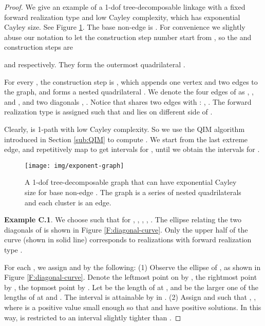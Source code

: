 \documentclass[secthm,amsthm,english]{article}
\theoremstyle{definition}
\theoremstyle{remark}
\begin{document}
\begin{proof}
We give an example of a 1-dof tree-decomposable linkage 
with a fixed forward realization type  and low Cayley complexity, 
which has exponential Cayley size. 
See Figure \ref{F:exponent-graph}. 
The base non-edge is .
For convenience we slightly abuse our notation to let 
the construction step number start from , 
so the  and  construction steps are 

and  respectively. 
They form the outermost quadrilateral .

For every , 
the  construction step  is ,
which appends one vertex and two edges to the graph, and forms a nested
quadrilateral . 
We denote the four
edges of  as , ,
 and , 
and two diagonals , .
Notice that  shares two edges with : , .
The forward realization type  is assigned such that  and  lies on
different side of . 

Clearly,  is 1-path with low Cayley complexity. 
So we use the QIM algorithm introduced in Section
\ref{sub:QIM} to compute . 
We start from the last extreme edge, 
and repetitively map  to get intervals for , 
until we obtain the intervals for . 

\begin{figure}[h]
	
	\begin{centering}
	\texttt{[image: img/exponent-graph]}
	\par\end{centering}
	
	\caption{A 1-dof tree-decomposable
	graph that can have exponential Cayley size for base non-edge .
	The graph is a series of nested quadrilaterals and each cluster is
	an edge.}


\label{F:exponent-graph} 
\end{figure}

\noindent \textbf{Example C.1}. 
We choose  such that for , ,
, ,
. 
The ellipse  relating
the two diagonals of  is shown in Figure \ref{F:diagonal-curve}. Only
the upper half of the curve (shown in solid line) corresponds to realizations
with forward realization type . 

For each ,
we assign  and 
by the following: 
(1) Observe the ellipse  of , as shown in Figure \ref{F:diagonal-curve}. 
Denote the leftmost point on  by , the rightmost point by , the topmost point by . 
Let  be the length of  at , 
and  be the larger one of the lengths of  at  and . 
The interval  is attainable by  in . 
(2) Assign  and  
such that ,
, 
where  is a positive value small enough so that 
and  have positive solutions. 
In this way,  is restricted to an interval 
slightly tighter than .



\end{proof}
\end{document}
